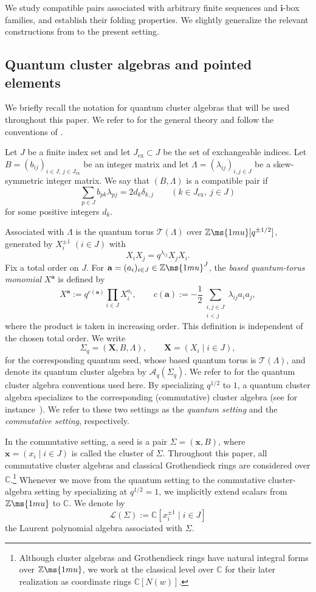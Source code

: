 \documentclass[12pt, leqno]{amsart}
\numberwithin{equation}{section}
\theoremstyle{plain}
\theoremstyle{definition}
\newcommand{\seteq}{\mathbin{:=}}
\newcommand{\ex}{\mathrm{ex}}
\newcommand{\C}{\mathbb{C}}
\newcommand{\Z}{\mathbb{Z}\ms{1mu}}
\newcommand{\bfX}{\mathbf{X}}
\newcommand{\bfa}{\mathbf{a}}
\newcommand{\bfi}{\mathbf{i}}
\newcommand{\bfx}{\mathbf{x}}
\newcommand{\calA}{\mathcal{A}}
\newcommand{\calL}{\mathcal{L}}
\newcommand{\calT}{\mathcal{T}}
\begin{document}
We study compatible pairs associated with arbitrary finite sequences
and $\bfi$-box families, and establish their folding properties.
We slightly generalize the relevant constructions from
\cite{GLS06,GLS08,GLS11,FHOO2,KKOP24A,KK24} to the present setting.

\subsection{Quantum cluster algebras and pointed elements}

We briefly recall the notation for quantum cluster algebras that will be
used throughout this paper. We refer to \cite{FZ02,BZ05} for the general theory
and follow the conventions of \cite{KKOP24A,FHOO2}.

Let $J$ be a finite index set and let $J_{\ex}\subset J$ be the set of
exchangeable indices. Let
$B=(b_{ij})_{i\in J,\,j\in J_{\ex}}$
be an integer matrix and let
$\Lambda=(\lambda_{ij})_{i,j\in J}$
be a skew-symmetric integer matrix. We say that $(B,\Lambda)$ is a
compatible pair if
\begin{equation}\label{eq: compatible pair}
\sum_{p\in J} b_{pk}\lambda_{pj} =2d_k\delta_{k,j} \qquad(k\in J_{\ex},\ j\in J)
\end{equation}
for some positive integers $d_k$.

Associated with $\Lambda$ is the quantum torus $\calT(\Lambda)$
over $\Z[q^{\pm1/2}]$, generated by $X_i^{\pm1}$ $(i\in J)$ with
\[
X_iX_j=q^{\lambda_{ij}}X_jX_i.
\]
Fix a total order on $J$.
For $\bfa=(a_i)_{i\in J}\in\Z^J$, the
\emph{based quantum-torus monomial} $X^{\bfa}$ is defined by
\[
X^{\bfa}\seteq q^{c(\bfa)}
\prod_{i\in J}X_i^{a_i},
\qquad
c(\bfa)\seteq
-\frac{1}{2}\sum_{\substack{i,j\in J\\i<j}}\lambda_{ij}a_i a_j,
\]
where the product is taken in increasing order.
This definition is independent of the chosen total order. We write
\[
\Sigma_q=(\bfX,B,\Lambda), \qquad \bfX=(X_i\mid i\in J),
\]
for the corresponding quantum seed, whose based quantum torus is
$\calT(\Lambda)$, and denote its quantum cluster algebra by
$\calA_q(\Sigma_q)$.
We refer to \cite[Section~2.1]{KKOP23F} for the quantum cluster algebra
conventions used here. By specializing $q^{1/2}$ to $1$, a quantum cluster algebra specializes
to the corresponding (commutative) cluster algebra (see for instance~\cite[\S A.4]{FHOO}). We refer to these
two settings as the \emph{quantum setting} and the \emph{commutative
setting}, respectively.

In the commutative setting, a seed is a pair $\Sigma=(\bfx,B)$,
where $\bfx=(x_i\mid i\in J)$ is called the cluster of $\Sigma$.
Throughout this paper, all commutative cluster algebras and classical
Grothendieck rings are considered over $\C$.\footnote{Although cluster
algebras and Grothendieck rings have natural integral forms over $\Z$,
we work at the classical level over $\C$ for their later realization
as coordinate rings $\C[N(w)]$.} Whenever we move from the quantum
setting to the commutative cluster-algebra setting by specializing at
$q^{1/2}=1$, we implicitly extend scalars from $\Z$ to $\C$. We denote by
\[
\calL(\Sigma)\seteq\C[x_i^{\pm1}\mid i\in J]
\]
the Laurent polynomial algebra associated with $\Sigma$.
\end{document}
